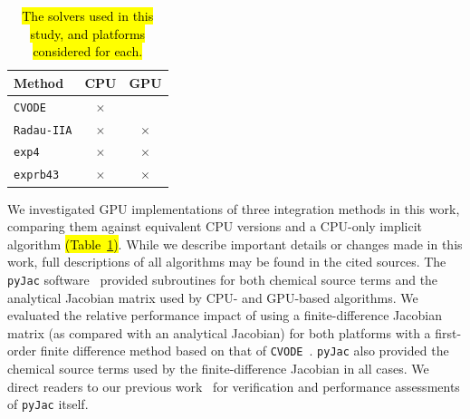 \documentclass[preprint,review,11pt]{elsarticle}
\DeclareRobustCommand{\hly}[1]{\sethlcolor{yellow}\hl{#1}}
\begin{document}
\begin{table}[htb]
\centering
\begin{tabular}{@{}l c c@{}}
\toprule
Method & CPU & GPU \\
\midrule
\texttt{CVODE} & $\times$ & \\
\texttt{Radau-IIA} & $\times$ & $\times$ \\
\texttt{exp4} & $\times$ & $\times$ \\
\texttt{exprb43} & $\times$ & $\times$ \\
\bottomrule
\end{tabular}
\caption{\hly{The solvers used in this study, and platforms considered for each.}}
\label{T:solvers}
\end{table}

We investigated GPU implementations of three integration methods in this work, comparing them against equivalent CPU versions and a CPU-only implicit algorithm \hly{(Table~\ref{T:solvers})}.
While we describe important details or changes made in this work, full descriptions of all algorithms may be found in the cited sources.
The \texttt{pyJac} software~\cite{niemeyer_2016_51139,Niemeyer:2015ws,Niemeyer:2016aa} provided subroutines for both chemical source terms and the analytical Jacobian matrix used by CPU- and GPU-based algorithms.
We evaluated the relative performance impact of using a finite-difference Jacobian matrix (as compared with an analytical Jacobian) for both platforms with a first-order finite difference method based on that of \texttt{CVODE}~\cite{Hindmarsh:2005hg}.
\texttt{pyJac} also provided the chemical source terms used by the finite-difference Jacobian in all cases.
We direct readers to our previous work~\cite{Niemeyer:2015ws,Niemeyer:2016aa} for verification and performance assessments of \texttt{pyJac} itself.
\end{document}
